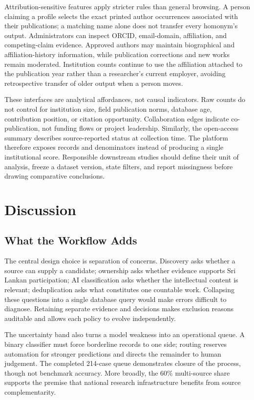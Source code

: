 \documentclass[conference]{IEEEtran}
\begin{document}
Attribution-sensitive features apply stricter rules than general browsing. A person claiming a profile selects the exact printed author occurrences associated with their publications; a matching name alone does not transfer every homonym's output. Administrators can inspect ORCID, email-domain, affiliation, and competing-claim evidence. Approved authors may maintain biographical and affiliation-history information, while publication corrections and new works remain moderated. Institution counts continue to use the affiliation attached to the publication year rather than a researcher's current employer, avoiding retrospective transfer of older output when a person moves.

These interfaces are analytical affordances, not causal indicators. Raw counts do not control for institution size, field publication norms, database age, contribution position, or citation opportunity. Collaboration edges indicate co-publication, not funding flows or project leadership. Similarly, the open-access summary describes source-reported status at collection time. The platform therefore exposes records and denominators instead of producing a single institutional score. Responsible downstream studies should define their unit of analysis, freeze a dataset version, state filters, and report missingness before drawing comparative conclusions.

\section{Discussion}
\subsection{What the Workflow Adds}
The central design choice is separation of concerns. Discovery asks whether a source can supply a candidate; ownership asks whether evidence supports Sri Lankan participation; AI classification asks whether the intellectual content is relevant; deduplication asks what constitutes one countable work. Collapsing these questions into a single database query would make errors difficult to diagnose. Retaining separate evidence and decisions makes exclusion reasons auditable and allows each policy to evolve independently.

The uncertainty band also turns a model weakness into an operational queue. A binary classifier must force borderline records to one side; routing reserves automation for stronger predictions and directs the remainder to human judgement. The completed 214-case queue demonstrates closure of the process, though not benchmark accuracy. More broadly, the 60\% multi-source share supports the premise that national research infrastructure benefits from source complementarity.
\end{document}

